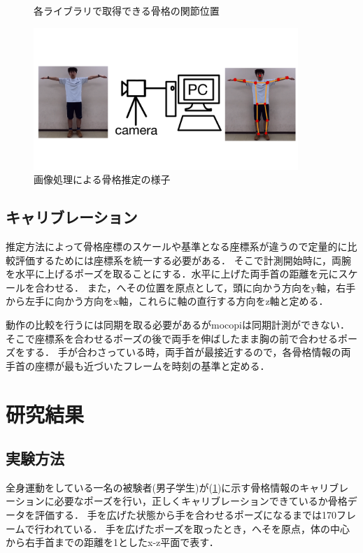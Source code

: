 \documentclass[a4j, fleqn, 12pt]{jsreport}
\begin{document}
\begin{figure}[t]
\begin{minipage}[]{0.45\hsize}
    \label{RGBD}
  \end{minipage}
  \caption{各ライブラリで取得できる骨格の関節位置}
  \label{sokutei}
\end{figure}
\begin{figure}[b]
  \centering
  \includegraphics[width=10cm]{img/image_3D.png}
  \caption{画像処理による骨格推定の様子}
  \label{image_3D}
\end{figure}
\section{キャリブレーション}\label{kyari}
推定方法によって骨格座標のスケールや基準となる座標系が違うので定量的に比較評価するためには座標系を統一する必要がある．
そこで計測開始時に，両腕を水平に上げるポーズを取ることにする．水平に上げた両手首の距離を元にスケールを合わせる．
また，へその位置を原点として，頭に向かう方向をy軸，右手から左手に向かう方向をx軸，これらに軸の直行する方向をz軸と定める．

動作の比較を行うには同期を取る必要があるがmocopiは同期計測ができない．
そこで座標系を合わせるポーズの後で両手を伸ばしたまま胸の前で合わせるポーズをする．
手が合わさっている時，両手首が最接近するので，各骨格情報の両手首の座標が最も近づいたフレームを時刻の基準と定める．

\chapter{研究結果}
\section{実験方法}
全身運動をしている一名の被験者(男子学生)が(\ref{kyari})に示す骨格情報のキャリブレーションに必要なポーズを行い，正しくキャリブレーションできているか骨格データを評価する．
手を広げた状態から手を合わせるポーズになるまでは170フレームで行われている．
手を広げたポーズを取ったとき，へそを原点，体の中心から右手首までの距離を1としたx-z平面で表す．
\end{document}
